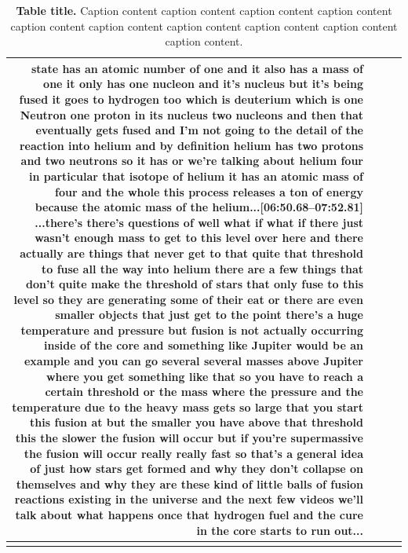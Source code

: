 \documentclass[10pt]{article}
\begin{document}
\begin{tiny}
\begin{longtable}{|r|p{0.375in}|p{1.275in}|p{3.5in}|}
state has an atomic number of one and it also has a mass of one it only has one nucleon and it's nucleus but it's being fused it goes to hydrogen too which is deuterium which is one Neutron one proton in its nucleus two nucleons and then that eventually gets fused and I'm not going to the detail of the reaction into helium and by definition helium has two protons and two neutrons so it has or we're talking about helium four in particular that isotope of helium it has an atomic mass of four and the whole this process releases a ton of energy because the atomic mass of the helium...\newline\textbf{[06:50.68--07:52.81]} ...there's there's questions of well what if what if there just wasn't enough mass to get to this level over here and there actually are things that never get to that quite that threshold to fuse all the way into helium there are a few things that don't quite make the threshold of stars that only fuse to this level so they are generating some of their eat or there are even smaller objects that just get to the point there's a huge temperature and pressure but fusion is not actually occurring inside of the core and something like Jupiter would be an example and you can go several several masses above Jupiter where you get something like that so you have to reach a certain threshold or the mass where the pressure and the temperature due to the heavy mass gets so large that you start this fusion at but the smaller you have above that threshold this the slower the fusion will occur but if you're supermassive the fusion will occur really really fast so that's a general idea of just how stars get formed and why they don't collapse on themselves and why they are these kind of little balls of fusion reactions existing in the universe and the next few videos we'll talk about what happens once that hydrogen fuel and the cure in the core starts to run out... \\\hline

    \caption{\textbf{Table title.} Caption content caption content caption content caption content caption content caption content caption content caption content caption content caption content.}
    \end{longtable}
\end{tiny}
\end{document}
